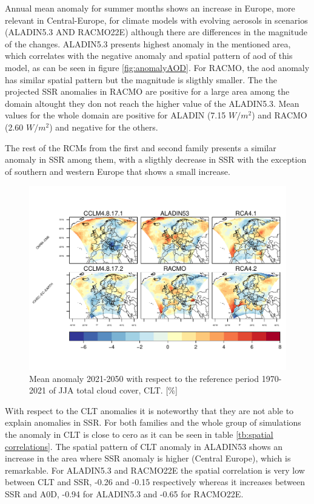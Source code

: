 Annual mean anomaly for summer months shows an increase in Europe, more relevant in Central-Europe, for climate models with evolving aerosols in scenarios (ALADIN5.3 AND RACMO22E) although there are differences in the magnitude of the changes. ALADIN5.3 presents highest anomaly in the mentioned area, which correlates with the negative anomaly and spatial pattern of aod of this model, as can be seen in figure \ref{fig:anomalyAOD}. For RACMO, the aod anomaly has similar spatial pattern but the magnitude is sligthly smaller. The the projected SSR anomalies in RACMO are positive for a large area among the domain altought they don not reach the higher value of the ALADIN5.3. Mean values for the whole domain are positive for ALADIN (7.15 $W/m^2$) and RACMO (2.60 $W/m^2$) and negative for the others.

The rest of the RCMs from the first and second family presents a similar anomaly in SSR among them, with a sligthly decrease in SSR with the exception of southern and western Europe that shows a small increase.

\begin{figure}[h]
\centering\includegraphics[width=1\textwidth]{figs/capitulo7/ANOMALIAS_JJA_CLT_2050-2021_r12.pdf}
\caption{Mean anomaly 2021-2050 with respect to the reference period 1970-2021 of JJA total cloud cover, CLT. [$\%$]}
\label{fig:anomalyCLT}
\end{figure}

With respect to the CLT anomalies it is noteworthy that they are not able to explain anomalies in SSR. For both families and the whole group of simulations the anomaly in CLT is close to cero as it can be seen in table \ref{tb:spatial correlations}. The spatial pattern of CLT anomaly in ALADIN53 shows an increase in the area where SSR anomaly is higher (Central Europe), which is remarkable. For ALADIN5.3 and RACMO22E the spatial correlation is very low between CLT and SSR, -0.26 and -0.15 respectively whereas it increases between SSR and A0D, -0.94 for ALADIN5.3 and -0.65 for RACMO22E.

